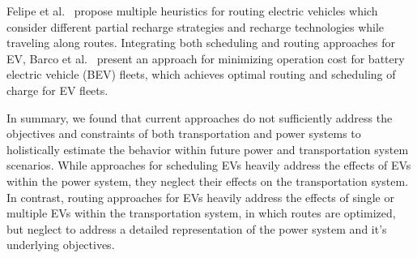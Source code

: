 Felipe et al.~\cite{felipe2014heuristic} propose multiple heuristics for routing electric vehicles which consider different partial recharge strategies and recharge technologies while traveling along routes. 
Integrating both scheduling and routing approaches for EV, Barco et al.~\cite{barco2013optimal} present an approach for minimizing operation cost for battery electric vehicle (BEV) fleets, which achieves optimal routing and scheduling of charge for EV fleets.


In summary, we found that current approaches do not sufficiently address the objectives and constraints of both transportation and power systems to holistically estimate the behavior within future power and transportation system scenarios. While approaches for scheduling EVs heavily address the effects of EVs within the power system, they neglect their effects on the transportation system. In contrast, routing approaches for EVs heavily address the effects of single or multiple EVs within the transportation system, in which routes are optimized, but neglect to address a detailed representation of the power system and it's underlying objectives.


